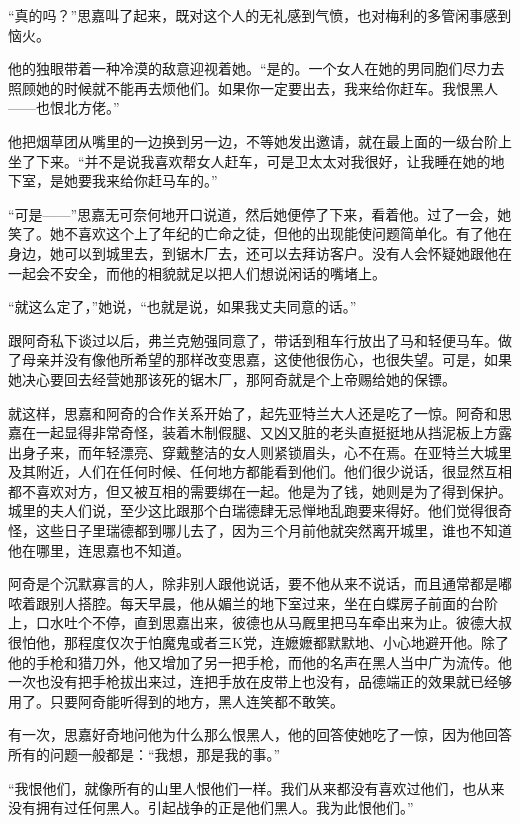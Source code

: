 \par “真的吗？”思嘉叫了起来，既对这个人的无礼感到气愤，也对梅利的多管闲事感到恼火。
\par 他的独眼带着一种冷漠的敌意迎视着她。“是的。一个女人在她的男同胞们尽力去照顾她的时候就不能再去烦他们。如果你一定要出去，我来给你赶车。我恨黑人——也恨北方佬。”
\par 他把烟草团从嘴里的一边换到另一边，不等她发出邀请，就在最上面的一级台阶上坐了下来。“并不是说我喜欢帮女人赶车，可是卫太太对我很好，让我睡在她的地下室，是她要我来给你赶马车的。”
\par “可是——”思嘉无可奈何地开口说道，然后她便停了下来，看着他。过了一会，她笑了。她不喜欢这个上了年纪的亡命之徒，但他的出现能使问题简单化。有了他在身边，她可以到城里去，到锯木厂去，还可以去拜访客户。没有人会怀疑她跟他在一起会不安全，而他的相貌就足以把人们想说闲话的嘴堵上。
\par “就这么定了，”她说，“也就是说，如果我丈夫同意的话。”
\par 跟阿奇私下谈过以后，弗兰克勉强同意了，带话到租车行放出了马和轻便马车。做了母亲并没有像他所希望的那样改变思嘉，这使他很伤心，也很失望。可是，如果她决心要回去经营她那该死的锯木厂，那阿奇就是个上帝赐给她的保镖。
\par 就这样，思嘉和阿奇的合作关系开始了，起先亚特兰大人还是吃了一惊。阿奇和思嘉在一起显得非常奇怪，装着木制假腿、又凶又脏的老头直挺挺地从挡泥板上方露出身子来，而年轻漂亮、穿戴整洁的女人则紧锁眉头，心不在焉。在亚特兰大城里及其附近，人们在任何时候、任何地方都能看到他们。他们很少说话，很显然互相都不喜欢对方，但又被互相的需要绑在一起。他是为了钱，她则是为了得到保护。城里的夫人们说，至少这比跟那个白瑞德肆无忌惮地乱跑要来得好。他们觉得很奇怪，这些日子里瑞德都到哪儿去了，因为三个月前他就突然离开城里，谁也不知道他在哪里，连思嘉也不知道。
\par 阿奇是个沉默寡言的人，除非别人跟他说话，要不他从来不说话，而且通常都是嘟哝着跟别人搭腔。每天早晨，他从媚兰的地下室过来，坐在白蝶房子前面的台阶上，口水吐个不停，直到思嘉出来，彼德也从马厩里把马车牵出来为止。彼德大叔很怕他，那程度仅次于怕魔鬼或者三K党，连嬷嬷都默默地、小心地避开他。除了他的手枪和猎刀外，他又增加了另一把手枪，而他的名声在黑人当中广为流传。他一次也没有把手枪拔出来过，连把手放在皮带上也没有，品德端正的效果就已经够用了。只要阿奇能听得到的地方，黑人连笑都不敢笑。
\par 有一次，思嘉好奇地问他为什么那么恨黑人，他的回答使她吃了一惊，因为他回答所有的问题一般都是：“我想，那是我的事。”
\par “我恨他们，就像所有的山里人恨他们一样。我们从来都没有喜欢过他们，也从来没有拥有过任何黑人。引起战争的正是他们黑人。我为此恨他们。”
